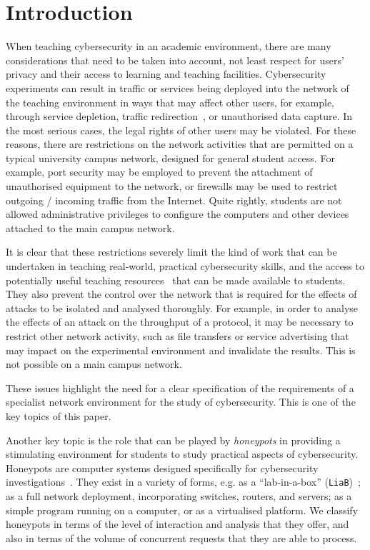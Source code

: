 \documentclass{ieeeaccess}
\begin{document}
\section{Introduction}\label{intro}
When teaching cybersecurity in an academic environment, there are many
considerations that need to be taken into account, not least respect for
users' privacy and their access to learning and teaching facilities.
Cybersecurity experiments can result in traffic or services being deployed
into the network of the teaching environment in ways that may affect other
users, for example, through service depletion, traffic
redirection~\cite{ACGO:06,LR:06}, or unauthorised data capture. In the most
serious cases, the legal rights of other users may be violated.
For these reasons, there are restrictions on the network activities that are
permitted on a typical university campus network, designed for general
student access. For example, port security may be employed to prevent the
attachment of unauthorised equipment to the network, or firewalls may be used
to restrict outgoing / incoming traffic from the Internet. Quite rightly,
students are not allowed administrative privileges to configure the computers
and other devices attached to the main campus network.

It is clear that these restrictions severely limit the kind of work that can be
undertaken in teaching real-world, practical cybersecurity skills, and the
access to potentially useful teaching resources~\cite{ACGO:06,YYLCHJ:04} that
can be made available to students. They also prevent the control over the
network that is required for the effects of attacks to be isolated and analysed
thoroughly. For example, in order to analyse the effects of an attack on the
throughput of a protocol, it may be necessary to restrict other network
activity, such as file transfers or service advertising that may impact on the
experimental environment and invalidate the results. This is not possible on a
main campus network.

These issues highlight the need for a clear specification of the requirements
of a specialist network environment for the study of cybersecurity. This is one of the
key topics of this paper.

Another key topic is the role that can be played by \emph{honeypots} in
providing a stimulating environment for students to study practical aspects of
cybersecurity.  Honeypots are computer systems designed specifically for
cybersecurity investigations~\cite{FKAS:17,BCF:12}.  They exist in a variety of
forms, e.g. as a ``lab-in-a-box'' (\texttt{LiaB})~\cite{CFDMH:09}; as a full
network deployment, incorporating switches, routers, and servers; as a simple
program running on a computer, or as a virtualised platform. 
We classify honeypots in terms of the level of interaction and analysis that
they offer, and also in terms of the volume of concurrent requests that they
are able to process.
\end{document}
